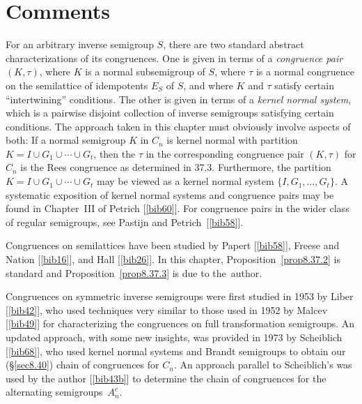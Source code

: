 \documentclass{surv-l}
\numberwithin{equation}{section}
\numberwithin{table}{section}
\numberwithin{figure}{section}
\theoremstyle{plain}
\theoremstyle{definition}
\begin{document}
\section{Comments}\label{sec8.41}

For an arbitrary inverse semigroup $S$, there are two standard
abstract characterizations of its congruences. One is given in
terms of a \emph{congruence pair}
$(K,\tau)$, where $K$ is a normal subsemigroup of $S$, where
$\tau$ is a normal congruence on the semilattice of idempotents
$E_{S}$ of $S$, and where $K$ and $\tau$ satisfy certain
``intertwining'' conditions. The other is given in terms of a
\emph{kernel normal system}, which is
a pairwise disjoint collection of inverse semigroups satisfying
certain conditions. The approach taken in this chapter must
obviously involve aspects of both: If a normal semigroup $K$ in
$C_{n}$ is kernel normal with partition $K=I\cup
G_{1}\cup\cdots\cup G_{t}$, then the $\tau$ in the corresponding
congruence pair $(K, \tau)$ for $C_{n}$ is the Rees congruence as
determined in 37.3. Furthermore, the partition $K=I \cup
G_{1}\cup\cdots\cup G_{t}$ may be viewed as a kernel normal system
$\{I, G_{1},\ldots, G_{t}\}$. A systematic exposition of kernel
normal systems and congruence pairs may be found in Chapter~III of
Petrich [\ref{bib60}]. For congruence pairs in
the wider class of regular semigroups, see Pastijn and Petrich~[\ref{bib58}].

Congruences on semilattices have been studied by
Papert [\ref{bib58}],
Freese and Nation
[\ref{bib16}], and Hall
[\ref{bib26}]. In this chapter,
Proposition~\ref{prop8.37.2} is standard and
Proposition~\ref{prop8.37.3} is due to the~author.

Congruences on symmetric inverse semigroups were first studied in
1953 by Liber [\ref{bib42}],
who used techniques very similar to those used in 1952 by
Malcev [\ref{bib49}] for
characterizing the congruences on full transformation semigroups.
An updated approach, with some new insights, was provided in 1973
by Scheiblich
[\ref{bib68}], who used kernel normal systems
and Brandt semigroups to obtain our (\S\ref{sec8.40}) chain of
congruences for $C_{n}$. An approach parallel to Scheiblich's was
used by the author [\ref{bib43b}] to determine
the chain of congruences for the alternating
semigroups~$A_{n}^{c}$.
\end{document}
